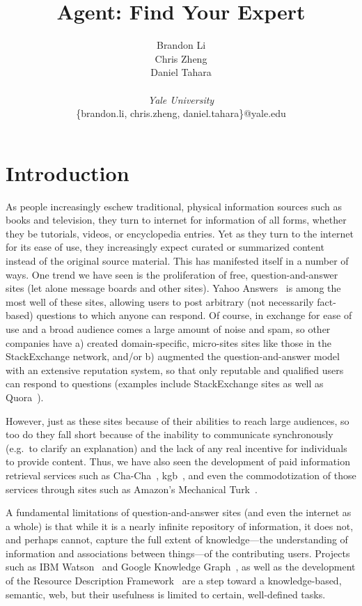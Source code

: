 \documentclass[11pt]{article}
\begin{document}
\title{Agent: Find Your Expert}
\author{
  Brandon Li\\
  Chris Zheng \\
  Daniel Tahara\\ \\
  {\it Yale University}\\
  \{brandon.li, chris.zheng, daniel.tahara\}@yale.edu
}
\renewcommand{\today}{}
\maketitle

\section{Introduction}
\label{sec:intro}
As people increasingly eschew traditional, physical information sources such as
books and television, they turn to internet for information of all forms,
whether they be tutorials, videos, or encyclopedia entries. Yet as they turn to
the internet for its ease of use, they increasingly expect curated or summarized
content instead of the original source material. This has manifested itself in a
number of ways. One trend we have seen is the proliferation of free,
question-and-answer sites (let alone message boards and other sites).  Yahoo
Answers~\cite{yahoo} is among the most well of these sites, allowing users to
post arbitrary (not necessarily fact-based) questions to which anyone can
respond. Of course, in exchange for ease of use and a broad audience comes a
large amount of noise and spam, so other companies have a) created
domain-specific, micro-sites sites like those in the StackExchange\cite{stackx}
network, and/or b) augmented the question-and-answer model with an extensive
reputation system, so that only reputable and qualified users can respond to
questions (examples include StackExchange sites as well as Quora~\cite{quora}).

However, just as these sites because of their abilities to reach large
audiences, so too do they fall short because of the inability to communicate
synchronously (e.g.\ to clarify an explanation) and the lack of any real
incentive for individuals to provide content. Thus, we have also seen the
development of paid information retrieval services such as
Cha-Cha~\cite{chacha}, kgb~\cite{kgb}, and even the commodotization of those
services through sites such as Amazon's Mechanical Turk~\cite{turk}.

A fundamental limitations of question-and-answer sites (and even the internet as
a whole) is that while it is a nearly infinite repository of information, it
does not, and perhaps cannot, capture the full extent of knowledge---the
understanding of information and associations between things---of the
contributing users. Projects such as IBM Watson~\cite{watson} and Google
Knowledge Graph~\cite{knowledge}, as well as the development of the Resource
Description Framework~\cite{rdf} are a step toward a knowledge-based, semantic,
web, but their usefulness is limited to certain, well-defined tasks.
\end{document}
